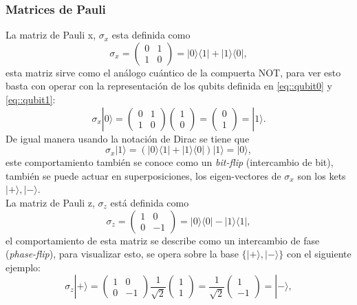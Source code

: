 \documentclass[a4paper]{article}
\begin{document}
\subsubsection{Matrices de Pauli}\label{sec::PauliMatrix}
La matriz de Pauli x, $\sigma_x$ esta definida como 
\begin{equation}
\sigma_x=\begin{pmatrix}
		0 &1 \\
		1 &0
	\end{pmatrix}=|0\rangle\langle 1|+|1\rangle\langle 0|,
\end{equation}
esta matriz sirve como el análogo cuántico de la compuerta NOT, para ver esto basta con operar con la representación de los qubits definida en \ref{eq::qubit0} y \ref{eq::qubit1}:
\begin{equation}
\sigma_x|0\rangle=
	\begin{pmatrix}
		0 &1 \\
		1 &0
	\end{pmatrix}
	\begin{pmatrix}
		1 \\
		0
	\end{pmatrix}=
	\begin{pmatrix}
		0 \\
		1
	\end{pmatrix}=|1\rangle .
\end{equation}
De igual manera usando la notación de Dirac se tiene que
\begin{equation}
\sigma_x|1\rangle=(|0\rangle\langle 1|+|1\rangle\langle 0|)|1\rangle=|0\rangle ,
\end{equation}
este comportamiento también se conoce como un \textit{bit-flip} (intercambio de bit), también se puede actuar en superposiciones, los eigen-vectores de $\sigma_x$ son los kets $|+\rangle, |-\rangle$.\\
La matriz de Pauli z, $\sigma_z$ está definida como 
\begin{equation}
\sigma_z=
	\begin{pmatrix}
		1 &0 \\
		0 &-1
	\end{pmatrix}=|0\rangle\langle 0|-|1\rangle\langle 1| ,
\end{equation}
el comportamiento de esta matriz se describe como un intercambio de fase (\textit{phase-flip}), para visualizar esto, se opera  sobre la base $\{|+\rangle, |-\rangle\}$ con el siguiente ejemplo:
\begin{equation*}
\sigma_z|+\rangle=
	\begin{pmatrix}
		1 &0 \\
		0 &-1
	\end{pmatrix}\frac{1}{\sqrt{2}}
	\begin{pmatrix}
		1 \\
		1
	\end{pmatrix}=\frac{1}{\sqrt{2}}
	\begin{pmatrix}
		1 \\
		-1
	\end{pmatrix}=|-\rangle ,
\end{equation*}
\end{document}
